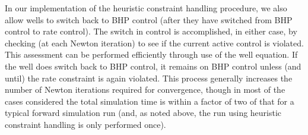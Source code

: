 \documentclass[twocolumn,numbook]{svjour3}          %
\begin{document}
In our implementation of the heuristic constraint handling procedure, we also allow wells to switch back to BHP control (after they have switched from BHP control to rate control). The switch in control is accomplished, in either case, by checking (at each Newton iteration) to see if the current active control is violated. This assessment can be performed efficiently through use of the well equation. If the well does switch back to BHP control, it remains on BHP control unless (and until) the rate constraint is again violated. This process generally increases the number of Newton iterations required for convergence, though in most of the cases considered the total simulation time is within a factor of two of that for a typical forward simulation run (and, as noted above, the run using heuristic constraint handling is only performed once). 


\end{document}
